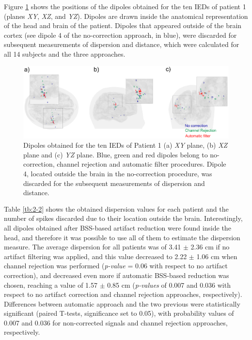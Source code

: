 Figure \ref{fig:2-5} shows the positions of the dipoles obtained for the ten IEDs of patient 1 (planes \textit{XY}, \textit{XZ}, and \textit{YZ}). Dipoles are drawn inside the anatomical representation of the head and brain of the patient. Dipoles that appeared outside of the brain cortex (see dipole 4 of the no-correction approach, in blue), were discarded for subsequent measurements of dispersion and distance, which were calculated for all 14 subjects and the three approaches.

\begin{figure}[h]

\centering
\includegraphics[width=1\textwidth]{Images/fig2-5.png}
\caption{Dipoles obtained for the ten IEDs of Patient 1 (a) \textit{XY} plane, (b) \textit{XZ} plane and (c) \textit{YZ} plane. Blue, green and red dipoles belong to no-correction, channel rejection and automatic filter procedures. Dipole 4, located outside the brain in the no-correction procedure, was discarded for the subsequent measurements of dispersion and distance.}
\label{fig:2-5}
\end{figure} 

Table \ref{tb:2-2} shows the obtained dispersion values for each patient and the number of spikes discarded due to their location outside the brain. Interestingly, all dipoles obtained after BSS-based artifact reduction were found inside the head, and therefore it was possible to use all of them to estimate the dispersion measure. The average dispersion for all patients was of 3.41 $\pm$ 2.36 cm if no artifact filtering was applied, and this value decreased to 2.22 $\pm$ 1.06 cm when channel rejection was performed (\textit{p-value} = 0.06 with respect to no artifact correction), and decreased even more if automatic BSS-based reduction was chosen, reaching a value of 1.57 $\pm$ 0.85 cm (\textit{p-values} of 0.007 and 0.036 with respect to no artifact correction and channel rejection approaches, respectively). Differences between automatic approach and the two previous were statistically significant (paired T-tests, significance set to 0.05), with probability values of 0.007 and 0.036 for non-corrected signals and channel rejection approaches, respectively.

